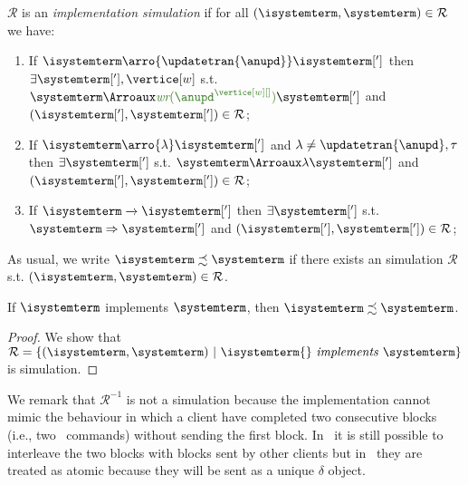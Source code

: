  

\begin{definition}[simulation] $\mathcal{R}$ is an {\em implementation simulation} if for all 
$(\isystemterm,\systemterm)\in\mathcal{R}$ we have:
\begin{enumerate}
   \item If $\isystemterm\arro{\updatetran{\anupd}}\isystemterm[']$ then  $\exists\systemterm['],\vertice[w]$ s.t.  $\systemterm\Arroi{\updatetranaux{\anupd^{\vertice[w][]}}}\systemterm[']$ and $(\isystemterm['],\systemterm['])\in\mathcal{R}$;
   \item If $\isystemterm\arro{\lambda}\isystemterm[']$ and $\lambda\neq \updatetran{\anupd},\tau$ then  $\exists\systemterm[']$  s.t.  $\systemterm\Arroi{\lambda}\systemterm[']$ and $(\isystemterm['],\systemterm['])\in\mathcal{R}$;
   \item If $\isystemterm\tr{}\isystemterm[']$  then  $\exists\systemterm[']$  s.t.  $\systemterm\Arro\systemterm[']$ and $(\isystemterm['],\systemterm['])\in\mathcal{R}$;
\end{enumerate} 
\end{definition}

As usual, we write $\isystemterm\precsim\systemterm$ if there exists an {simulation} $\mathcal{R}$ s.t.  
$(\isystemterm,\systemterm)\in\mathcal{R}$.

%
%

\begin{theorem}
\label{thm:simulation}
 If  $\isystemterm$ implements $\systemterm$, then $\isystemterm\precsim\systemterm$. 
\end{theorem}

\begin{proof}
We show that $\mathcal{R} = \{ (\isystemterm, \systemterm) \ |\ \implements{\isystemterm{}}{\systemterm} \}$ is simulation.
\end{proof}

We remark that  $\mathcal{R}^{-1}$ is not a simulation because the implementation cannot mimic  the 
behaviour in which a client   have completed two 
consecutive blocks (i.e., two \pushcmd\ commands) without sending the first block. In \gsp\, it is still possible to interleave the two 
blocks with blocks sent by other clients but in \igsp\  they are treated as atomic
because they  will be sent as a unique $\delta$ object. 